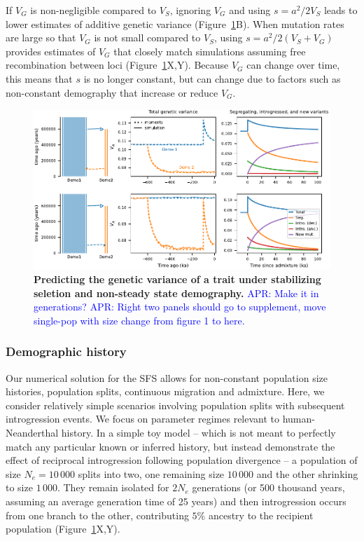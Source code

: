 \documentclass{article}
\newcommand{\aprcomment}[1]{{\textcolor{blue}{APR: #1}}}
\begin{document}
If $V_G$ is non-negligible compared to $V_S$, ignoring $V_G$ and using
$s=a^2/2V_S$ leads to lower estimates of additive genetic variance
(Figure~\ref{fig:toy-admixture}B). When mutation rates are large so that $V_G$
is not small compared to $V_S$, using $s=a^2/2(V_S+V_G)$ provides estimates of
$V_G$ that closely match simulations assuming free recombination between loci
(Figure~\ref{fig:toy-admixture}X,Y). Because $V_G$ can change over time, this
means that $s$ is no longer constant, but can change due to factors such as
non-constant demography that increase or reduce $V_G$.

\begin{figure}[tb!]
    \centering
    \includegraphics{../figures/reciprocal_admixture.pdf}
    \caption{
        \textbf{Predicting the genetic variance of a trait under stabilizing
        seletion and non-steady state demography.}
        \aprcomment{Make it in generations?}
        \aprcomment{Right two panels should go to supplement, move single-pop
        with size change from figure 1 to here.}
    }
    \label{fig:toy-admixture}
\end{figure}

\subsubsection*{Demographic history}

Our numerical solution for the SFS allows for non-constant population size
histories, population splits, continuous migration and admixture. Here, we
consider relatively simple scenarios involving population splits with
subsequent introgression events. We focus on parameter regimes relevant to
human-Neanderthal history. In a simple toy model -- which is not meant to
perfectly match any particular known or inferred history, but instead
demonstrate the effect of reciprocal introgression following population
divergence -- a population of size $N_e=10\,000$ splits into two, one remaining
size $10\,000$ and the other shrinking to size $1\,000$. They remain isolated
for $2N_e$ generations (or 500 thousand years, assuming an average generation
time of 25 years) and then introgression occurs from one branch to the other,
contributing $5\%$ ancestry to the recipient population
(Figure~\ref{fig:toy-admixture}X,Y).
\end{document}
